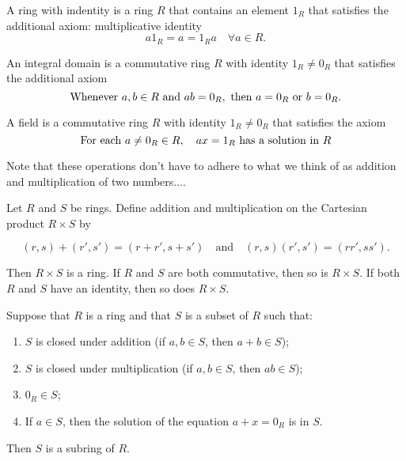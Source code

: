 \documentclass[../main.tex]{subfiles}
\begin{document}
\begin{definition} \label{def: multiplicative identity}
A ring with indentity is a ring \(R\) that contains an element \(1_R\) that satisfies the additional axiom: multiplicative identity
\[
a1_R = a = 1_R a \quad \forall a \in R.
\]
\end{definition}

\begin{definition}\label{def:integral domain}
An integral domain is a commutative ring \(R\) with identity \(1_R \neq 0_R\) that satisfies the additional axiom
\[
\textnormal{Whenever } a,b \in R \textnormal{ and } ab = 0_R, \textnormal{ then } a = 0_R \textnormal{ or } b = 0_R.
\]
    
\end{definition}


\begin{definition}[Field]\label{def:field}
A field is a commutative ring \(R\) with identity \(1_R \neq 0_R\) that satisfies the axiom 
\[
\textnormal{For each } a \neq 0_R \in R, \quad ax = 1_R \textnormal{ has a solution in \(R\)}
\]
\end{definition}


\begin{remark}
Note that these operations don't have to adhere to what we think of as addition and multiplication of two numbers....
\end{remark}



\begin{proposition}\label{prp:cartesian prod ring}
Let $R$ and $S$ be rings. Define addition and multiplication on the Cartesian product $R \times S$ by

\[
(r, s) + (r', s') = (r + r', s + s') \quad \text{and} \quad (r, s)(r', s') = (rr', ss').
\]

Then $R \times S$ is a ring. If $R$ and $S$ are both commutative, then so is $R \times S$. If both $R$ and $S$ have an identity, then so does $R \times S$.
\end{proposition}





\begin{theorem}[Subring] \label{thm:check for subring}
Suppose that $R$ is a ring and that $S$ is a subset of $R$ such that:
\begin{enumerate}
    \item $S$ is closed under addition (if $a, b \in S$, then $a + b \in S$);
    \item $S$ is closed under multiplication (if $a, b \in S$, then $ab \in S$);
    \item $0_R \in S$;
    \item If $a \in S$, then the solution of the equation $a + x = 0_R$ is in $S$.
\end{enumerate}
Then $S$ is a subring of $R$.
\end{theorem}
\end{document}
